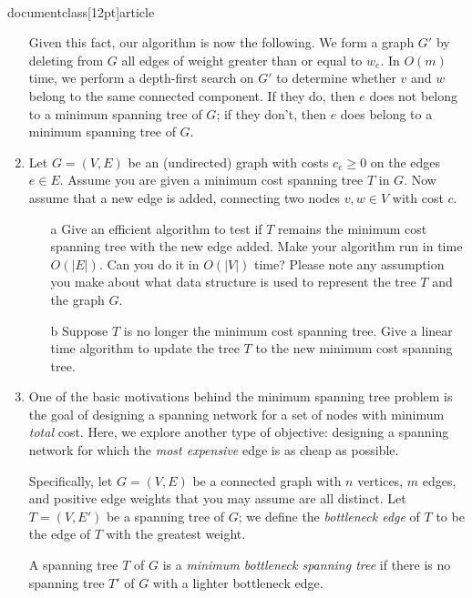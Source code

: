 \\documentclass[12pt]{article}
\begin{document}
\begin{enumerate}
{Given this fact, our algorithm is now the following.
We form a graph $G'$ by deleting from $G$ all 
edges of weight greater than or equal to $w_e$.
In $O(m)$ time, we perform a depth-first search on $G'$
to determine whether $v$ and $w$ belong to the
same connected component.
If they do, then $e$ does not belong to a minimum spanning tree of $G$;
if they don't, then $e$ does belong to a minimum spanning tree of $G$.
}



\item 

Let $G=(V,E)$ be an (undirected) graph with 
costs $c_e \ge 0$ on the edges $e \in E$. Assume you are given a 
minimum cost spanning tree $T$ in $G$. Now assume that a new edge 
is added, connecting two nodes $v,w \in V$ with cost $c$.
\begin{itemize}
\item[a] Give an efficient algorithm to test if $T$ remains the minimum
cost spanning tree with the new edge added. Make your algorithm run in 
time $O(|E|)$. Can you do it in $O(|V|)$ time? Please note any 
assumption  you make about what data structure is used 
to represent the tree $T$ and the graph $G$.
\item[b] Suppose $T$ is no longer the minimum cost spanning tree. 
Give a linear time algorithm to update the tree $T$ to the new minimum cost 
spanning tree.
\end{itemize}



\item 

One of the basic motivations behind the minimum
spanning tree problem is the goal of designing a spanning
network for a set of nodes with minimum {\em total} cost.
Here, we explore another type of objective:
designing a spanning network for which the {\em most expensive} edge
is as cheap as possible.

Specifically, let $G = (V,E)$ be a connected graph with
$n$ vertices, $m$ edges, and positive edge weights that you may
assume are all distinct.
Let $T = (V,E')$ be a spanning tree of $G$; we define
the {\em bottleneck edge} of $T$ to be the edge of $T$
with the greatest weight.

A spanning tree $T$ of $G$ is a {\em minimum bottleneck spanning tree}
if there is no spanning tree $T'$ of $G$ with a lighter
bottleneck edge.


\end{enumerate}
\end{document}
